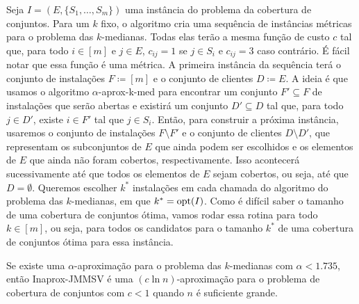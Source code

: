 Seja $I = (E,\{S_1,\ldots,S_m\})$ uma instância do problema da cobertura de conjuntos. Para um $k$ fixo, o algoritmo cria uma sequência de instâncias métricas para o problema das $k$-medianas. Todas elas terão a mesma função de custo $c$ tal que, para todo $i \in [m]$ e $j \in E$, $c_{ij} = 1$ se $j \in S_i$ e $c_{ij} = 3$ caso contrário. É fácil notar que essa função é uma métrica.
A primeira instância da sequência terá o conjunto de instalações $F \coloneqq [m]$ e o conjunto de clientes $D \coloneqq E$. 
A ideia é que usamos o algoritmo {\sc $\alpha$-aprox-k-med} para encontrar um conjunto $F' \subseteq F$ de instalações que serão abertas e existirá um conjunto $D' \subseteq D$ tal que, para todo $j \in D'$, existe $i \in F'$ tal que $j \in S_i$. 
Então, para construir a próxima instância, usaremos o conjunto de instalações $F \setminus F'$ e o conjunto de clientes $D \setminus D'$, que representam os subconjuntos de $E$ que ainda podem ser escolhidos e os elementos de $E$ que ainda não foram cobertos, respectivamente.
Isso acontecerá sucessivamente até que todos os elementos de $E$ sejam cobertos, ou seja, até que $D = \emptyset$.
Queremos escolher $k^*$ instalações em cada chamada do algoritmo do problema das $k$-medianas, em que $k^* = \mathrm{opt}(I)$. Como é difícil saber o tamanho de uma cobertura de conjuntos ótima, vamos rodar essa rotina para todo $k \in [m]$, ou seja, para todos os candidatos para o tamanho $k^*$ de uma cobertura de conjuntos ótima para essa instância.

\begin{theorem}
Se existe uma $\alpha$-aproximação para o problema das $k$-medianas com $\alpha < 1.735$, então {\sc Inaprox-JMMSV} é uma $(c \ln n)$-aproximação para o problema de cobertura de conjuntos com $c<1$ quando $n$ é suficiente grande.
\end{theorem}

